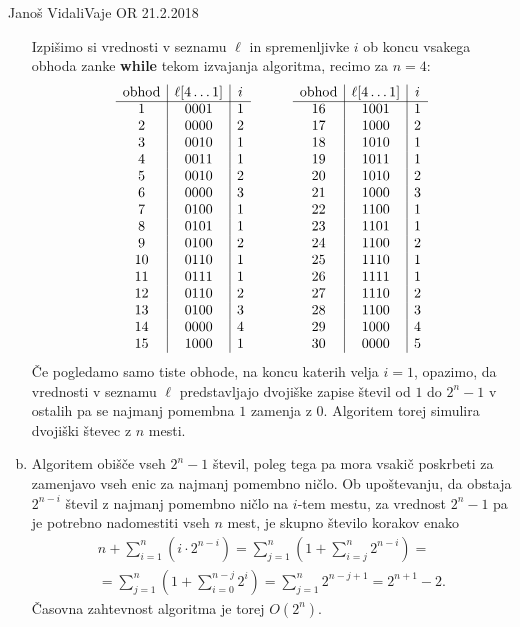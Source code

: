\begin{naloga}{Janoš Vidali}{Vaje OR 21.2.2018}
\begin{odgovor}
\begin{enumerate}[(a)]
Izpišimo si vrednosti v seznamu $\ell$ in spremenljivke $i$
ob koncu vsakega obhoda zanke {\bf while} tekom izvajanja algoritma,
recimo za $n = 4$:
$$
\begin{array}{c|c|ccc|c|c}
\text{obhod} & \ell[4 \dots 1] & i &\qquad&
\text{obhod} & \ell[4 \dots 1] & i \\ \cline{1-3} \cline{5-7}
 1 & 0001 & 1 && 16 & 1001 & 1 \\
 2 & 0000 & 2 && 17 & 1000 & 2 \\
 3 & 0010 & 1 && 18 & 1010 & 1 \\
 4 & 0011 & 1 && 19 & 1011 & 1 \\
 5 & 0010 & 2 && 20 & 1010 & 2 \\
 6 & 0000 & 3 && 21 & 1000 & 3 \\
 7 & 0100 & 1 && 22 & 1100 & 1 \\
 8 & 0101 & 1 && 23 & 1101 & 1 \\
 9 & 0100 & 2 && 24 & 1100 & 2 \\
10 & 0110 & 1 && 25 & 1110 & 1 \\
11 & 0111 & 1 && 26 & 1111 & 1 \\
12 & 0110 & 2 && 27 & 1110 & 2 \\
13 & 0100 & 3 && 28 & 1100 & 3 \\
14 & 0000 & 4 && 29 & 1000 & 4 \\
15 & 1000 & 1 && 30 & 0000 & 5 \\
\end{array}
$$
Če pogledamo samo tiste obhode, na koncu katerih velja $i = 1$, opazimo,
da vrednosti v seznamu $\ell$ predstavljajo
dvojiške zapise števil od $1$ do $2^n - 1$
v ostalih pa se najmanj pomembna $1$ zamenja z $0$.
Algoritem torej simulira dvojiški števec z $n$ mesti.

\item Algoritem obišče vseh $2^n - 1$ števil,
poleg tega pa mora vsakič poskrbeti za zamenjavo vseh enic
za najmanj pomembno ničlo.
Ob upoštevanju, da obstaja $2^{n-i}$ števil
z najmanj pomembno ničlo na $i$-tem mestu,
za vrednost $2^n - 1$ pa je potrebno nadomestiti vseh $n$ mest,
je skupno število korakov enako
\begin{multline*}
n + \sum_{i=1}^n (i \cdot 2^{n-i}) =
\sum_{j=1}^n \left(1 + \sum_{i=j}^n 2^{n-i}\right) = \\
= \sum_{j=1}^n \left(1 + \sum_{i=0}^{n-j} 2^i\right) =
\sum_{j=1}^n 2^{n-j+1} = 2^{n+1} - 2 .
\end{multline*}
Časovna zahtevnost algoritma je torej $O(2^n)$.
\end{enumerate}
\end{odgovor}
\end{naloga}
